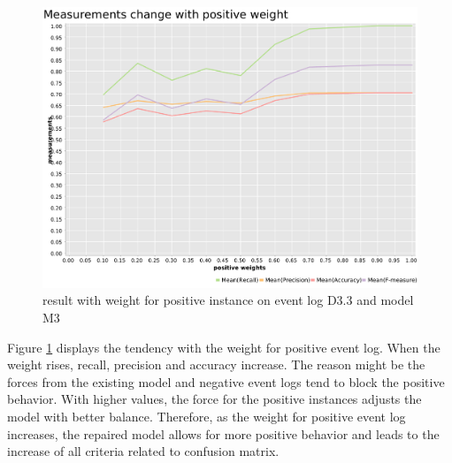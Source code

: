 \begin{figure}[htb]
	\includegraphics[width=\linewidth]{figures/evaluation/M3-D43-pos-weight-plot.pdf}
	\caption{result with weight for positive instance on event log D3.3 and model M3}
	\label{fig:pos-weight}
\end{figure}
Figure \ref{fig:pos-weight} displays the tendency with the weight for positive event log. When the weight rises, recall, precision and accuracy increase. The reason might be the forces from the existing model and negative event logs tend to block the positive behavior. With higher values, the force for the positive instances adjusts the model with better balance. Therefore, as the weight for positive event log increases, the repaired model allows for more positive behavior and leads to the increase of all criteria related to confusion matrix.

